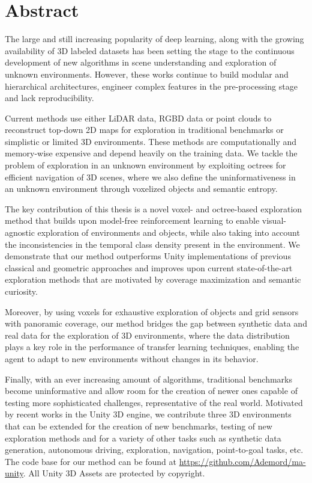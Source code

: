 \chapter*{Abstract}

The large and still increasing popularity of deep learning, along with the growing availability of 3D labeled datasets has been setting the stage to the continuous development of new algorithms in scene understanding and exploration of unknown environments. However, these works continue to build modular and hierarchical architectures, engineer complex features in the pre-processing stage and lack reproducibility.

Current methods use either LiDAR data, RGBD data or point clouds to reconstruct top-down 2D maps for exploration in traditional benchmarks or simplistic or limited 3D environments. These methods are computationally and memory-wise expensive and depend heavily on the training data. We tackle the problem of exploration in an unknown environment by exploiting octrees for efficient navigation of 3D scenes, where we also define the uninformativeness in an unknown environment through voxelized objects and semantic entropy.

The key contribution of this thesis is a novel voxel- and octree-based exploration method that builds upon model-free reinforcement learning to enable visual-agnostic exploration of environments and objects, while also taking into account the inconsistencies in the temporal class density present in the environment. 
We demonstrate that our method outperforms Unity implementations of previous classical and geometric approaches and improves upon current state-of-the-art exploration methods that are motivated by coverage maximization and semantic curiosity.

Moreover, by using voxels for exhaustive exploration of objects and grid sensors with panoramic coverage, our method bridges the gap between synthetic data and real data for the exploration of 3D environments, where the data distribution plays a key role in the performance of transfer learning techniques, enabling the agent to adapt to new environments without changes in its behavior.

Finally, with an ever increasing amount of algorithms, traditional benchmarks become uninformative and allow room for the creation of newer ones capable of testing more sophisticated challenges, representative of the real world. Motivated by recent works in the Unity 3D engine, we contribute three 3D environments that can be extended for the creation of new benchmarks, testing of new exploration methods and for a variety of other tasks such as synthetic data generation, autonomous driving, exploration, navigation, point-to-goal tasks, etc. The code base for our method can be found at \url{https://github.com/Ademord/ma-unity}. All Unity 3D Assets are protected by copyright.



